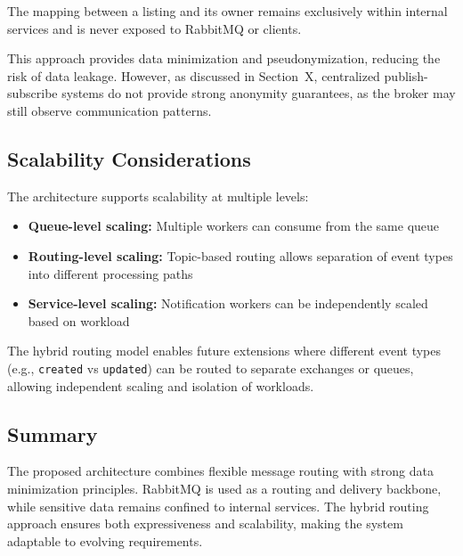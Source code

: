 The mapping between a listing and its owner remains exclusively within internal services and is never exposed to RabbitMQ or clients.

This approach provides data minimization and pseudonymization, reducing the risk of data leakage. However, as discussed in Section~X, centralized publish-subscribe systems do not provide strong anonymity guarantees, as the broker may still observe communication patterns.

\subsection{Scalability Considerations}

The architecture supports scalability at multiple levels:

\begin{itemize}
    \item \textbf{Queue-level scaling:} Multiple workers can consume from the same queue
    \item \textbf{Routing-level scaling:} Topic-based routing allows separation of event types into different processing paths
    \item \textbf{Service-level scaling:} Notification workers can be independently scaled based on workload
\end{itemize}

The hybrid routing model enables future extensions where different event types (e.g., \texttt{created} vs \texttt{updated}) can be routed to separate exchanges or queues, allowing independent scaling and isolation of workloads.

\subsection{Summary}

The proposed architecture combines flexible message routing with strong data minimization principles. RabbitMQ is used as a routing and delivery backbone, while sensitive data remains confined to internal services. The hybrid routing approach ensures both expressiveness and scalability, making the system adaptable to evolving requirements.
